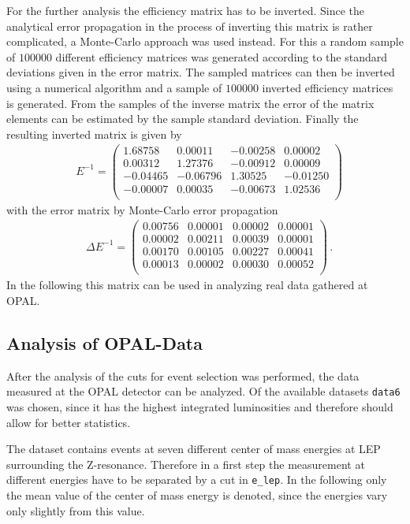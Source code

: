 \documentclass[11pt, a4paper]{article}
\numberwithin{equation}{section}
\begin{document}
For the further analysis the efficiency matrix has to be inverted.
Since the analytical error propagation in the process of inverting this matrix is rather complicated, a Monte-Carlo approach was used instead.
For this a random sample of $\num{100000}$ different efficiency matrices was generated according to the standard deviations given in the error matrix.
The sampled matrices can then be inverted using a numerical algorithm and a sample of $\num{100000}$ inverted efficiency matrices is generated.
From the samples of the inverse matrix the error of the matrix elements can be estimated by the sample standard deviation.
Finally the resulting inverted matrix is given by
\begin{align*}
&E^{-1} = \begin{pmatrix}
	1.68758 & 0.00011 &-0.00258 & 0.00002 \\
	0.00312 & 1.27376 &-0.00912 & 0.00009 \\
   -0.04465 &-0.06796 & 1.30525 &-0.01250 \\
   -0.00007 & 0.00035 &-0.00673 & 1.02536 \\
\end{pmatrix}
\end{align*}
with the error matrix by Monte-Carlo error propagation
\begin{align*}
&\Delta E^{-1} = \begin{pmatrix}
	0.00756 & 0.00001 & 0.00002 & 0.00001 \\
	0.00002 & 0.00211 & 0.00039 & 0.00001 \\
	0.00170 & 0.00105 & 0.00227 & 0.00041 \\
	0.00013 & 0.00002 & 0.00030 & 0.00052 \\
\end{pmatrix} \,\text{.}
\end{align*}
In the following this matrix can be used in analyzing real data gathered at OPAL.

\subsection{Analysis of OPAL-Data}
After the analysis of the cuts for event selection was performed, the data measured at the OPAL detector can be analyzed.
Of the available datasets \texttt{data6} was chosen, since it has the highest integrated luminosities and therefore should allow for better statistics.

The dataset contains events at seven different center of mass energies at LEP surrounding the Z-resonance.
Therefore in a first step the measurement at different energies have to be separated by a cut in \texttt{e\_lep}.
In the following only the mean value of the center of mass energy is denoted, since the energies vary only slightly from this value.
\end{document}
